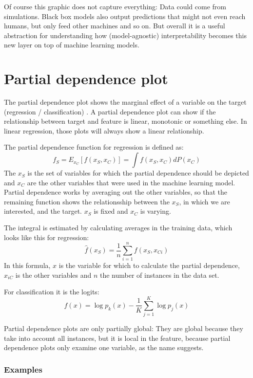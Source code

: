 \documentclass[12pt,]{krantz}
\theoremstyle{definition}
\theoremstyle{definition}
\theoremstyle{definition}
\theoremstyle{remark}
\begin{document}
Of course this graphic does not capture everything: Data could come from
simulations. Black box models also output predictions that might not
even reach humans, but only feed other machines and so on. But overall
it is a useful abstraction for understanding how (model-agnostic)
interpretability becomes this new layer on top of machine learning
models.

\section{Partial dependence plot}\label{pdp}

The partial dependence plot shows the marginal effect of a variable on
the target (regression / classification) \citep{friedman2001greedy}. A
partial dependence plot can show if the relationship between target and
feature is linear, monotonic or something else. In linear regression,
those plots will always show a linear relationship.

The partial dependence function for regression is defined as:
\[f_S = E_{x_C}[f(x_S, x_C)] = \int f(x_S, x_C) dP(x_C)\] The \(x_S\) is
the set of variables for which the partial dependence should be depicted
and \(x_C\) are the other variables that were used in the machine
learning model. Partial dependence works by averaging out the other
variables, so that the remaining function shows the relationsship
between the \(x_S\), in which we are interested, and the target. \(x_S\)
is fixed and \(x_C\) is varying.

The integral is estimated by calculating averages in the training data,
which looks like this for regression:
\[ \hat{f}(x_S) = \frac{1}{n} \sum_{i=1}^n f(x_S, x_{Ci}) \] In this
formula, \(x\) is the variable for which to calculate the partial
dependence, \(x_{iC}\) is the other variables and \(n\) the number of
instances in the data set.

For classification it is the logits:
\[ f(x) = \log p_k(x) - \frac{1}{K} \sum_{j=1}^K \log p_j(x) \]

Partial dependence plots are only partially global: They are global
because they take into account all instances, but it is local in the
feature, because partial dependence plots only examine one variable, as
the name suggests.

\subsubsection{Examples}\label{examples}
\end{document}
